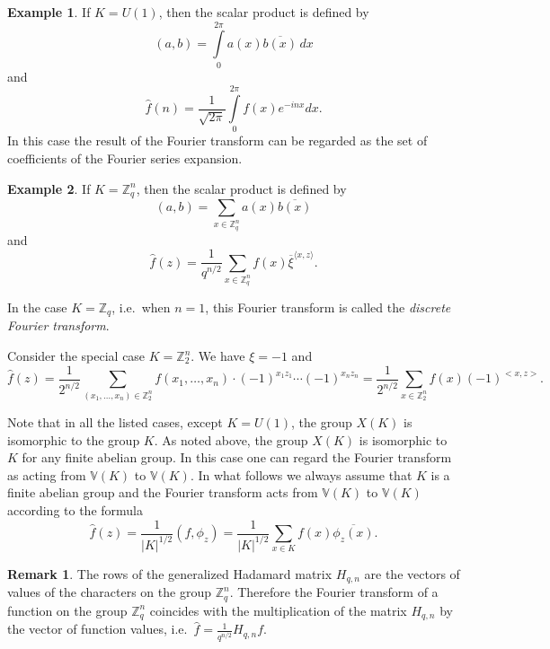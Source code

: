 \documentclass[11pt]{article}
\theoremstyle{definition}
\newtheorem{remark}{Remark}[section]
\newtheorem{example}{Example}[section]
\begin{document}
{{{\begin{example}
If $K=U(1)$, then the scalar product is defined by
\[(a,b)=\int\limits_0^{2\pi}a(x)\overline{b(x)}\,dx\]
and
\[\widehat{f}(n)=\frac{1}{\sqrt{2\pi}}\int\limits_0^{2\pi}f(x)e^{-inx}dx.\]
In this case the result of the Fourier transform can be regarded as the set of coefficients of the Fourier series expansion.
\end{example}

\begin{example}
If $K=\mathbb{Z}^n_q$, then the scalar product is defined by
\[(a,b)=\sum\limits_{x\in \mathbb{Z}^n_q}a(x) \overline{b(x)}\]
and
\[\widehat{f}(z)=\frac{1}{q^{n/2}}\sum\limits_{x\in \mathbb{Z}^n_q}f(x)\overline{\xi}^{\langle x,z\rangle}. \]

In the case $K=\mathbb{Z}_q$, i.e.\ when $n=1$, this Fourier transform is called the {\sl discrete Fourier transform}.

Consider the special case $K=\mathbb{Z}_2^n$. We have $\xi=-1$ and
\[\widehat{f}(z)=\frac{1}{2^{n/2}}\sum\limits_{(x_1,\ldots,x_n)\in \mathbb{Z}_2^n}f(x_1,\ldots,x_n)\cdot (-1)^{x_1 z_1}\cdots (-1)^{x_n z_n}
= \frac{1}{2^{n/2}}\sum\limits_{x\in \mathbb{Z}_2^n}
f(x)(-1)^{<x,z>}. \]
\end{example}

Note that in all the listed cases, except $K=U(1)$, the group $X(K)$ is isomorphic to the group $K$. As noted above, the group $X(K)$ is isomorphic to $K$ for any finite abelian group. In this case one can regard the Fourier transform as acting from $\mathbb{V}(K)$ to $\mathbb{V}(K)$. In what follows we always assume that $K$ is a finite abelian group and the Fourier transform acts from $\mathbb{V}(K)$ to $\mathbb{V}(K)$ according to the formula
\[\widehat{f}(z)=\frac{1}{|K|^{1/2}}(f,\phi_z)= \frac{1}{|K|^{1/2}}\sum\limits_{x\in K}f(x)\overline{\phi_z(x)}. \]


\begin{remark}
The rows of the generalized Hadamard matrix $H_{q,n}$ are the vectors of values of the characters on the group $\mathbb{Z}_q^n$. Therefore the Fourier transform of a function on the group $\mathbb{Z}_q^n$ coincides with the multiplication of the matrix $H_{q,n}$ by the vector of function values, i.e.\ $\widehat{f}=\frac{1}{q^{n/2}}H_{q,n}f$.
\end{remark}




}}}
\end{document}
